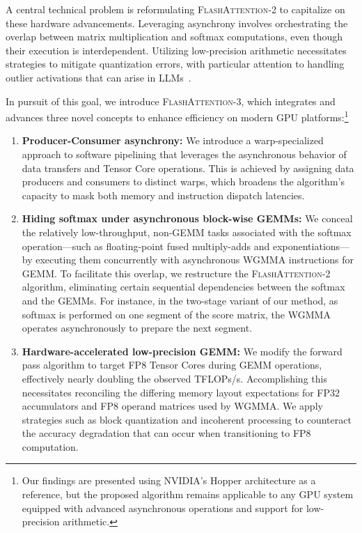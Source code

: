 A central technical problem is reformulating \textsc{FlashAttention-2} to capitalize on these hardware advancements. Leveraging asynchrony involves orchestrating the overlap between matrix multiplication and softmax computations, even though their execution is interdependent. Utilizing low-precision arithmetic necessitates strategies to mitigate quantization errors, with particular attention to handling outlier activations that can arise in LLMs~\citep{dettmers2208llm, sun2024massive}.

In pursuit of this goal, we introduce \textsc{FlashAttention-3}, which integrates and advances three novel concepts to enhance efficiency on modern GPU platforms:\footnote{Our findings are presented using NVIDIA’s Hopper architecture as a reference, but the proposed algorithm remains applicable to any GPU system equipped with advanced asynchronous operations and support for low-precision arithmetic.}

\begin{enumerate}

\item \textbf{Producer-Consumer asynchrony:} We introduce a warp-specialized approach to software pipelining that leverages the asynchronous behavior of data transfers and Tensor Core operations. This is achieved by assigning data producers and consumers to distinct warps, which broadens the algorithm’s capacity to mask both memory and instruction dispatch latencies.

\item \textbf{Hiding softmax under asynchronous block-wise GEMMs:} We conceal the relatively low-throughput, non-GEMM tasks associated with the softmax operation—such as floating-point fused multiply-adds and exponentiations—by executing them concurrently with asynchronous WGMMA instructions for GEMM. To facilitate this overlap, we restructure the \textsc{FlashAttention-2} algorithm, eliminating certain sequential dependencies between the softmax and the GEMMs. For instance, in the two-stage variant of our method, as softmax is performed on one segment of the score matrix, the WGMMA operates asynchronously to prepare the next segment.

\item \textbf{Hardware-accelerated low-precision GEMM:} We modify the forward pass algorithm to target FP8 Tensor Cores during GEMM operations, effectively nearly doubling the observed TFLOPs/s. Accomplishing this necessitates reconciling the differing memory layout expectations for FP32 accumulators and FP8 operand matrices used by WGMMA. We apply strategies such as block quantization and incoherent processing to counteract the accuracy degradation that can occur when transitioning to FP8 computation.
\end{enumerate}

